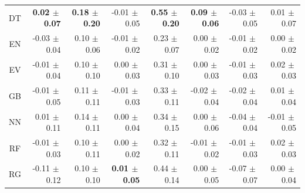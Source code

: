 \begin{table}[htb]
\begin{tabular}{crrrrrrr}
DT   &\textbf{ 0.02 $\pm~$0.07}                                       & \textbf{0.18 $\pm~$0.20}               & -0.01 $\pm~$0.05                                       & \textbf{0.55 $\pm~$0.20}            & \textbf{0.09 $\pm~$0.06}                                         & -0.03 $\pm~$0.05                                           & 0.01 $\pm~$0.07                                               \\
EN    & -0.03 $\pm~$0.04                                       & 0.10 $\pm~$0.06               & -0.01 $\pm~$0.02                                       & 0.23 $\pm~$0.07             & 0.00 $\pm~$0.02                                         & -0.01 $\pm~$0.02                                           & 0.00 $\pm~$0.02                                               \\
EV  & -0.01 $\pm~$0.04                                       & 0.10 $\pm~$0.10               & 0.00 $\pm~$0.03                                       & 0.31 $\pm~$0.10             & 0.00 $\pm~$0.03                                         & -0.01 $\pm~$0.03                                           & 0.02 $\pm~$0.03                                               \\
GB & -0.01 $\pm~$0.05                                       & 0.11 $\pm~$0.11               & -0.01 $\pm~$0.03                                       & 0.33 $\pm~$0.11             & -0.02 $\pm~$0.04                                         & -0.02 $\pm~$0.04                                           & 0.01 $\pm~$0.04                                               \\
NN   & 0.01 $\pm~$0.11                                       & 0.14 $\pm~$0.11               & 0.00 $\pm~$0.04                                       & 0.34 $\pm~$0.15             & 0.00 $\pm~$0.06                                         & -0.04 $\pm~$0.04                                           & -0.01 $\pm~$0.05                                              \\
RF   & -0.01 $\pm~$0.03                                       & 0.10 $\pm~$0.11               & 0.00 $\pm~$0.02                                       & 0.32 $\pm~$0.11             & -0.01 $\pm~$0.02                                         & -0.01 $\pm~$0.03                                           & 0.02 $\pm~$0.03                                               \\
RG       & -0.11 $\pm~$0.12                                       & 0.10 $\pm~$0.10               & \textbf{0.01 $\pm~$0.05}                                       & 0.44 $\pm~$0.14             & 0.00 $\pm~$0.05                                         & -0.07 $\pm~$0.07                                           & 0.00 $\pm~$0.04                                               \\

\end{tabular}
\end{table}
